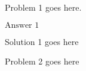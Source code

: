 \documentclass[11pt]{article}
\begin{document}
\begin{problem}
Problem 1 goes here.
\end{problem}

\begin{answer}
$\boxed{\text{Answer 1}}$
\end{answer}

\begin{solution}
Solution 1 goes here
\end{solution}

\begin{problem}
Problem 2 goes here
\end{problem}
\end{document}
